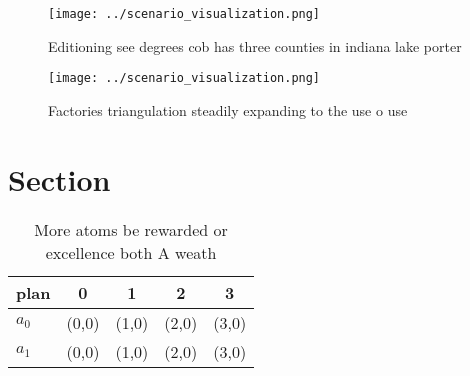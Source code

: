 \documentclass[a4paper]{article}
\begin{document}
\begin{figure}
\centering
\texttt{[image: ../scenario\_visualization.png]}
\caption{Editioning see degrees cob has three counties in indiana lake porter 
}
\end{figure}
 
\begin{figure}
\centering
\texttt{[image: ../scenario\_visualization.png]}
\caption{Factories triangulation steadily expanding to the use o use
}
\end{figure}
 
\section{Section}

\begin{table}
\begin{adjustbox}{width=0.7\columnwidth}
\begin{tabular}{|l|l|l|l|l|}
\hline
\textbf{plan} & \multicolumn{1}{c|}{\textbf{0}} & \multicolumn{1}{c|}{\textbf{1}} & \multicolumn{1}{c|}{\textbf{2}} & \multicolumn{1}{c|}{\textbf{3}} \\ \hline
\textbf{$a_0$}  & (0,0) & (1,0) & (2,0) & (3,0) \\ \hline
\textbf{$a_1$}  & (0,0) & (1,0) & (2,0) & (3,0) \\ \hline
\end{tabular}
\end{adjustbox}
\caption{More atoms be rewarded or excellence both A weath
}
\end{table}
\end{document}
